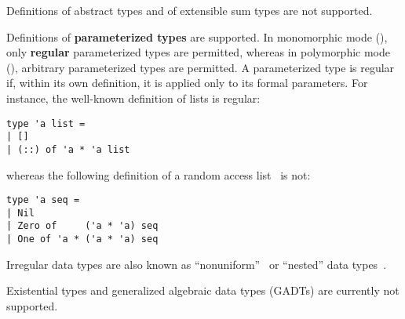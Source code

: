 \documentclass[11pt,a4paper,twoside]{article}
\renewcommand{\emph}[1]{\textbf{#1}}
\begin{document}
Definitions of abstract types and of extensible sum types are not supported.

\label{sec:regularity}

Definitions of \emph{parameterized types} are supported. In monomorphic mode
(), only \emph{\hbox{regular}}
parameterized types are permitted, whereas in polymorphic mode
(), arbitrary parameterized types are
permitted.
%
A parameterized type is regular if, within its own definition, it is applied
only to its formal parameters. For instance, the well-known definition of
lists is regular:

\begin{origenv}
\begin{lstlisting}
type 'a list =
| []
| (::) of 'a * 'a list
\end{lstlisting}
\end{origenv}
%
whereas the following definition of a random access
list~\cite[\S10.1.2]{okasaki-book-99} is not:
%
\begin{origenv}
\begin{lstlisting}
type 'a seq =
| Nil
| Zero of     ('a * 'a) seq
| One of 'a * ('a * 'a) seq
\end{lstlisting}
\end{origenv}

Irregular data types are also known as
``nonuniform''~\cite[\S10.1]{okasaki-book-99} or ``nested'' data
types~\cite{bird-meertens-98}.


Existential types and generalized algebraic data types (GADTs) are currently
not supported.


\end{document}
